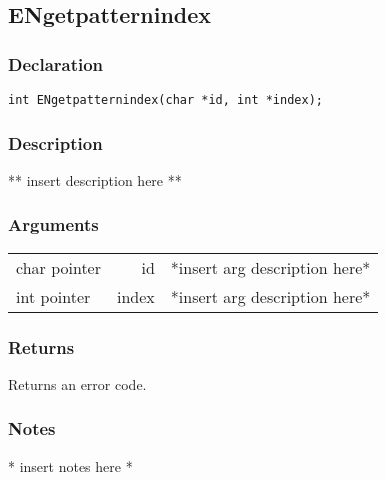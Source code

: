 \subsection{ENgetpatternindex}
\subsubsection{Declaration}
\begin{lstlisting}
int ENgetpatternindex(char *id, int *index);
\end{lstlisting}
\subsubsection{Description}
** insert description here **
\subsubsection{Arguments}
\begin{tabular}{l r p{11cm} }
char pointer&id&*insert arg description here* \\[6pt]
int pointer&index&*insert arg description here* \\[6pt]
\end{tabular}
\subsubsection{Returns}
Returns an error code.
\subsubsection{Notes}
* insert notes here *